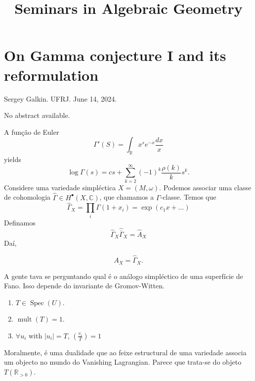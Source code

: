 



\title{Seminars in Algebraic Geometry}

\maketitle


\label{section-phantom}

\tableofcontents



\section{On Gamma conjecture I and its
reformulation}
\label{section-galkin-gamma-conjecture}

\noindent
Sergey Galkin.
UFRJ.
June 14, 2024.

\medskip\noindent
No abstract available.

\medskip\noindent
A fun\c c\~ao de Euler
$$
\Gamma'(S)=\int_{\mathbb{R}}x^se^{-x}
\frac{dx}{x}
$$
yields
$$
\log \Gamma(s)=cs+\sum_{k=2}^{\infty}
(-1)^k \frac{\rho(k)}{k} s^k.
$$
Considere uma variedade simpl\'ectica
$X=(M,\omega)$. Podemos associar uma classe
de cohomologia
$\hat{\Gamma}\in H^{\bullet}(X,\mathbb{C})$,
que chamamos a $\Gamma$-classe. Temos que
$$
\hat{\Gamma}_X=\prod_{i} \Gamma(1+x_i)
=\exp(c_1x+\ldots)
$$
Definamos
$$
\hat{\Gamma}_X\hat{\overline{\Gamma}}_X
=\hat{A}_X
$$
Da\'i,
\begin{definition}
\label{definition-galkin-property-gamma-i}
$$
A_X=\hat{\Gamma}_X.
$$
\end{definition}
A gente tava se perguntando qual \'e o
an\'alogo simpl\'ectico de uma superf\'icie
de Fano. Isso depende do invariante de
Gromov-Witten.

\begin{definition}[{\it Propriedade $O$}]
\label{definition-galkin-property-o}
\begin{enumerate}
\item $T\in \operatorname{Spec}(U)$.
\item $\operatorname{mult}(T)=1$.
\item $\forall u_i$ with $|u_i|=T$,
$\left( \frac{v_i}{T} \right) =1$
\end{enumerate}
\end{definition}
Moralmente, \'e uma dualidade que ao feixe
estructural de uma variedade associa um
objecto no mundo do Vanishing Lagrangian.
Parece que trata-se do objeto
$T(\mathbb{R}_{>0})$.

